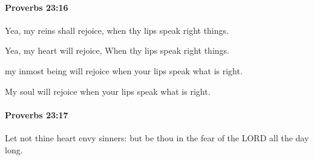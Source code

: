 		\paragraph{Proverbs 23:16} %
			\label{PROVERBS-23-16}

			Yea, my reins shall rejoice, when thy lips speak right things.

			\begin{versebox}
					\item[BHS] 
					\item[ASV] Yea, my heart will rejoice, When thy lips speak right things.
					\item[NIV] my inmost being will rejoice when your lips speak what is right.
					\item[NRSV] My soul will rejoice when your lips speak what is right.
			\end{versebox}

		\paragraph{Proverbs 23:17} %
			\label{PROVERBS-23-17}

			Let not thine heart envy sinners: but be thou in the fear of the LORD all the day long.

